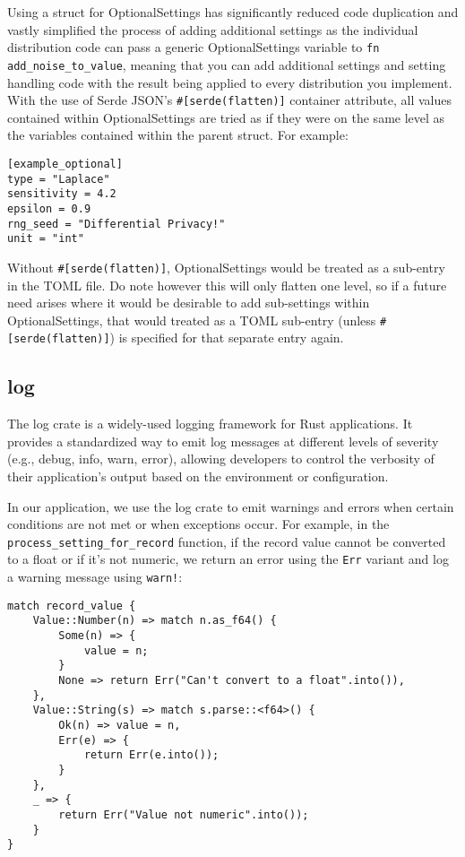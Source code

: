 Using a struct for OptionalSettings has significantly reduced code duplication and vastly simplified the process of adding additional settings as the individual distribution code can pass a generic OptionalSettings variable to \texttt{fn add_noise_to_value}, meaning that you can add additional settings and setting handling code with the result being applied to every distribution you implement. With the use of Serde JSON's \texttt{#[serde(flatten)]} container attribute, all values contained within OptionalSettings are tried as if they were on the same level as the variables contained within the parent struct. For example:

\begin{verbatim}
[example_optional]
type = "Laplace"
sensitivity = 4.2
epsilon = 0.9
rng_seed = "Differential Privacy!"
unit = "int"
\end{verbatim}
Without \texttt{#[serde(flatten)]}, OptionalSettings would be treated as a sub-entry in the TOML file. Do note however this will only flatten one level, so if a future need arises where it would be desirable to add sub-settings within OptionalSettings, that would treated as a TOML sub-entry (unless \texttt{#[serde(flatten)]}) is specified for that separate entry again.

\subsection{log}
The log crate is a widely-used logging framework for Rust applications. It provides a standardized way to emit log messages at different levels of severity (e.g., debug, info, warn, error), allowing developers to control the verbosity of their application's output based on the environment or configuration.

In our application, we use the log crate to emit warnings and errors when certain conditions are not met or when exceptions occur. For example, in the \texttt{process_setting_for_record} function, if the record value cannot be converted to a float or if it's not numeric, we return an error using the \texttt{Err} variant and log a warning message using \texttt{warn!}:

\begin{verbatim}
match record_value {
    Value::Number(n) => match n.as_f64() {
        Some(n) => {
            value = n;
        }
        None => return Err("Can't convert to a float".into()),
    },
    Value::String(s) => match s.parse::<f64>() {
        Ok(n) => value = n,
        Err(e) => {
            return Err(e.into());
        }
    },
    _ => {
        return Err("Value not numeric".into());
    }
}
\end{verbatim}

